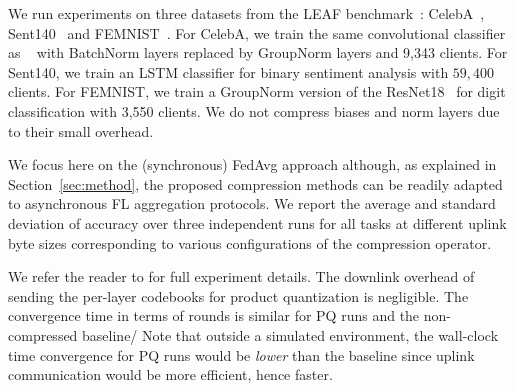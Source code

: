  We run experiments on three datasets from the LEAF benchmark~\cite{caldas2018leaf}: CelebA~\cite{liu2015faceattributes}, Sent140~\cite{Go_Bhayani_Huang_2009} and FEMNIST~\cite{lecun2010mnist}. For CelebA, we train the same convolutional classifier as ~\cite{nguyen2021federated} with BatchNorm layers replaced by GroupNorm layers and 9,343 clients. For Sent140, we train an LSTM classifier for binary sentiment analysis with $59,400$ clients.
For FEMNIST, we train a GroupNorm version of the ResNet18~\cite{he2015deep} for digit classification with 3,550 clients.
We do not compress biases and norm layers due to their small overhead.

  We focus here on the (synchronous) FedAvg approach although, as explained in Section~\ref{sec:method}, the proposed compression methods can be readily adapted to asynchronous FL aggregation protocols. 
We report the average and standard deviation of accuracy over three independent runs for all tasks at different uplink byte sizes corresponding to various configurations of the compression operator.


 We refer the reader to \cite{techreport} for full experiment details.
The downlink overhead of sending the per-layer codebooks for product quantization is negligible.
The convergence time in terms of rounds is similar for PQ runs and the non-compressed baseline/
Note that outside a simulated environment, the wall-clock time convergence for PQ runs would be \emph{lower} than the baseline since uplink communication would be more efficient, hence faster.

